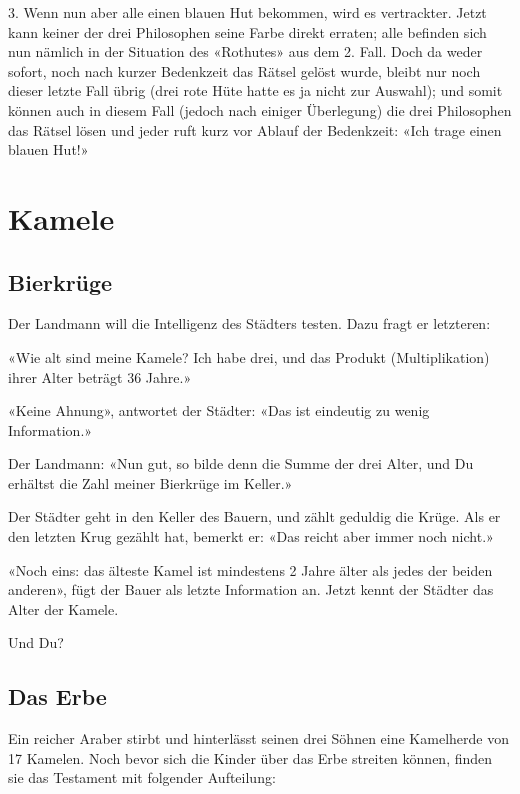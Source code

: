 {3. Wenn nun aber alle einen blauen Hut bekommen, wird es vertrackter.
Jetzt kann keiner der drei Philosophen seine Farbe direkt erraten; alle
befinden sich nun nämlich in der Situation des «Rothutes» aus dem 2.
Fall. Doch da weder sofort, noch nach kurzer Bedenkzeit das Rätsel gelöst
wurde, bleibt nur noch dieser letzte Fall übrig (drei rote Hüte hatte es ja
nicht zur Auswahl); und somit können auch in diesem Fall (jedoch nach
einiger Überlegung) die drei Philosophen das Rätsel lösen und jeder ruft
kurz vor Ablauf der Bedenkzeit: «Ich trage einen blauen Hut!»

}%


\newpage


\section{Kamele}
\subsection{Bierkrüge}

Der Landmann will die Intelligenz des Städters testen. Dazu fragt er letzteren:

«Wie alt sind meine Kamele? Ich habe drei, und das Produkt (Multiplikation)
ihrer Alter beträgt 36 Jahre.»

«Keine Ahnung», antwortet der Städter: «Das ist eindeutig zu wenig
Information.»

Der Landmann: «Nun gut, so bilde denn die Summe der drei Alter, und Du
erhältst die Zahl meiner Bierkrüge im Keller.»

Der Städter geht in den Keller des Bauern, und zählt geduldig die Krüge. Als er
den letzten Krug gezählt hat, bemerkt er: «Das reicht aber immer noch nicht.»

«Noch eins: das älteste Kamel ist mindestens 2 Jahre älter als jedes der beiden
anderen», fügt der Bauer als letzte Information an. Jetzt kennt der
Städter das Alter der Kamele.

Und Du?
\TNTeop{}


\subsection{Das Erbe}
Ein reicher Araber stirbt und hinterlässt seinen drei Söhnen eine Kamelherde
von 17 Kamelen. Noch bevor sich die Kinder über das Erbe streiten können,
finden sie das Testament mit folgender Aufteilung:

